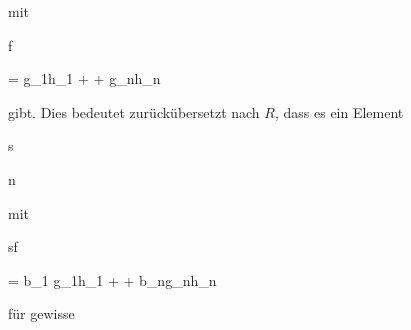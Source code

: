 {{{    }{
}

{   }{
}

}
{}{}{}
 {} {}
mit


\mavergleichskettedisp

{\vergleichskette

{f
}

{ =} { {  } g_1h_1 + \cdots + {  } g_nh_n
}

{ } {
}

{ } {
}

{ } {
}

}
{}{}{}
gibt. Dies bedeutet zurückübersetzt nach $R$, dass es ein Element


\mavergleichskette

{\vergleichskette

{ s
}

{ \notin }{ {\mathfrak n}
}

{  }{
}

{    }{
}

{   }{
}

}
{}{}{}
mit


\mavergleichskettedisp

{\vergleichskette

{ sf
}

{ =} { b_1 g_1h_1 + \cdots + b_ng_nh_n
}

{ } {
}

{ } {
}

{ } {
}

}
{}{}{}
für gewisse


\mavergleichskette

{\vergleichskette

}}
